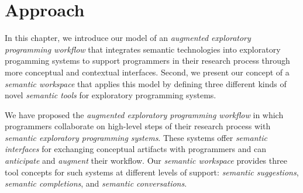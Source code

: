 
\chapter{Approach}
\label{cha:approach}

In this chapter, we introduce our model of an \emph{augmented exploratory programming workflow} that integrates semantic technologies into exploratory progamming systems to support programmers in their research process through more conceptual and contextual interfaces.
Second, we present our concept of a \emph{semantic workspace} that applies this model by defining three different kinds of novel \emph{semantic tools} for exploratory programming systems.


\begin{summary}
	We have proposed the \emph{augmented exploratory programming workflow} in which programmers collaborate on high-level steps of their research process with \emph{semantic exploratory programming systems}.
	These systems offer \emph{semantic interfaces} for exchanging conceptual artifacts with programmers and can \emph{anticipate} and \emph{augment} their workflow.
	Our \emph{semantic workspace} provides three tool concepts for such systems at different levels of support: \emph{semantic suggestions}, \emph{semantic completions}, and \emph{semantic conversations}.
\end{summary}
